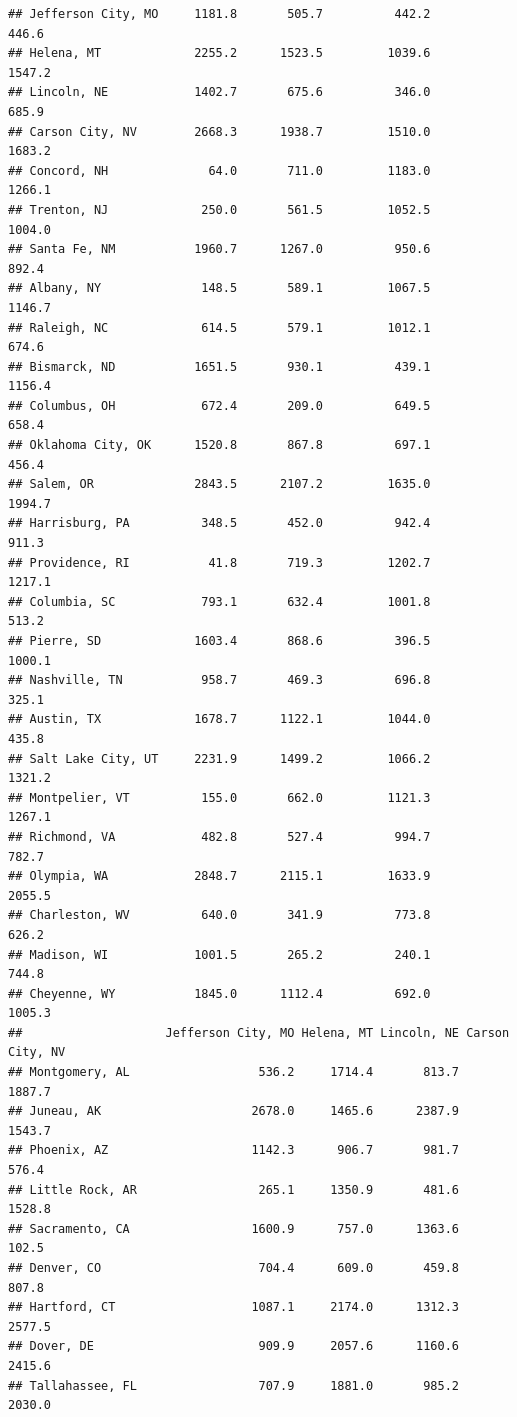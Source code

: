 \documentclass[
]{article}
\begin{document}
\begin{verbatim}
## Jefferson City, MO     1181.8       505.7          442.2       446.6
## Helena, MT             2255.2      1523.5         1039.6      1547.2
## Lincoln, NE            1402.7       675.6          346.0       685.9
## Carson City, NV        2668.3      1938.7         1510.0      1683.2
## Concord, NH              64.0       711.0         1183.0      1266.1
## Trenton, NJ             250.0       561.5         1052.5      1004.0
## Santa Fe, NM           1960.7      1267.0          950.6       892.4
## Albany, NY              148.5       589.1         1067.5      1146.7
## Raleigh, NC             614.5       579.1         1012.1       674.6
## Bismarck, ND           1651.5       930.1          439.1      1156.4
## Columbus, OH            672.4       209.0          649.5       658.4
## Oklahoma City, OK      1520.8       867.8          697.1       456.4
## Salem, OR              2843.5      2107.2         1635.0      1994.7
## Harrisburg, PA          348.5       452.0          942.4       911.3
## Providence, RI           41.8       719.3         1202.7      1217.1
## Columbia, SC            793.1       632.4         1001.8       513.2
## Pierre, SD             1603.4       868.6          396.5      1000.1
## Nashville, TN           958.7       469.3          696.8       325.1
## Austin, TX             1678.7      1122.1         1044.0       435.8
## Salt Lake City, UT     2231.9      1499.2         1066.2      1321.2
## Montpelier, VT          155.0       662.0         1121.3      1267.1
## Richmond, VA            482.8       527.4          994.7       782.7
## Olympia, WA            2848.7      2115.1         1633.9      2055.5
## Charleston, WV          640.0       341.9          773.8       626.2
## Madison, WI            1001.5       265.2          240.1       744.8
## Cheyenne, WY           1845.0      1112.4          692.0      1005.3
##                    Jefferson City, MO Helena, MT Lincoln, NE Carson City, NV
## Montgomery, AL                  536.2     1714.4       813.7          1887.7
## Juneau, AK                     2678.0     1465.6      2387.9          1543.7
## Phoenix, AZ                    1142.3      906.7       981.7           576.4
## Little Rock, AR                 265.1     1350.9       481.6          1528.8
## Sacramento, CA                 1600.9      757.0      1363.6           102.5
## Denver, CO                      704.4      609.0       459.8           807.8
## Hartford, CT                   1087.1     2174.0      1312.3          2577.5
## Dover, DE                       909.9     2057.6      1160.6          2415.6
## Tallahassee, FL                 707.9     1881.0       985.2          2030.0

\end{verbatim}
\end{document}
